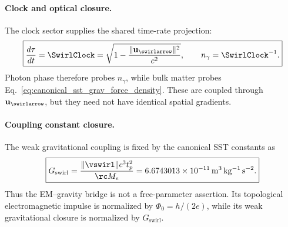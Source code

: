         \paragraph{Clock and optical closure.}
        The clock sector supplies the shared time-rate projection:
        \begin{align}
            \boxed{
            \frac{d\tau}{dt}
            =
            \SwirlClock
            =
            \sqrt{1-\frac{\lVert\mathbf{u}_{\swirlarrow}\rVert^2}{c^2}},
            \qquad
            n_\gamma=\SwirlClock^{-1}.
            }
            \label{eq:canonical_emg_clock_optical_closure}
        \end{align}
        Photon phase therefore probes \(n_\gamma\), while bulk matter probes Eq.~\eqref{eq:canonical_sst_grav_force_density}. These are coupled through \(\mathbf{u}_{\swirlarrow}\), but they need not have identical spatial gradients.

        \paragraph{Coupling constant closure.}
        The weak gravitational coupling is fixed by the canonical SST constants as
        \begin{align}
            \boxed{
            G_{\mathrm{swirl}}
            =
            \frac{\lVert\vswirl\rVert c^3 t_p^2}{\rc M_e}
            =
            6.6743013\times10^{-11}\,\mathrm{m^3\,kg^{-1}\,s^{-2}}.
            }
            \label{eq:canonical_gswirl_emg_closure}
        \end{align}
        Thus the EM--gravity bridge is not a free-parameter assertion. Its topological electromagnetic impulse is normalized by \(\Phi_0=h/(2e)\), while its weak gravitational closure is normalized by \(G_{\mathrm{swirl}}\).

